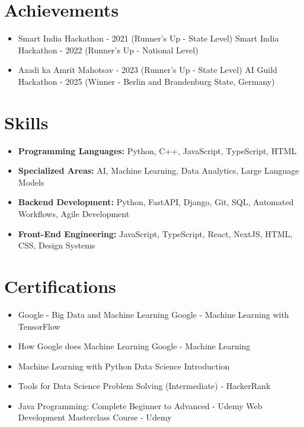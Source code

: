 \documentclass[a4paper,10pt]{article}
\begin{document}
\section*{Achievements}
\begin{itemize}
\item Smart India Hackathon - 2021 (Runner's Up - State Level) \hfill Smart India Hackathon - 2022 (Runner's Up - National Level)
\item Azadi ka Amrit Mahotsav - 2023 (Runner's Up - State Level) \hfill AI Guild Hackathon - 2025 (Winner - Berlin and Brandenburg State, Germany)
\end{itemize}

\section*{Skills}
\begin{itemize}
  \item \textbf{Programming Languages:} Python, C++, JavaScript, TypeScript, HTML
  \item \textbf{Specialized Areas:} AI, Machine Learning, Data Analytics, Large Language Models
  \item \textbf{Backend Development:} Python, FastAPI, Django, Git, SQL, Automated Workflows, Agile Development
  \item \textbf{Front-End Engineering:} JavaScript, TypeScript, React, NextJS, HTML, CSS, Design Systems
\end{itemize}

\section*{Certifications}
\begin{itemize}
\item Google - Big Data and Machine Learning \hfill Google - Machine Learning with TensorFlow
\item How Google does Machine Learning \hfill Google - Machine Learning
\item Machine Learning with Python \hfill Data Science Introduction
\item Tools for Data Science \hfill Problem Solving (Intermediate) - HackerRank
\item Java Programming: Complete Beginner to Advanced - Udemy \hfill Web Development Masterclass Course - Udemy
\end{itemize}
\end{document}
